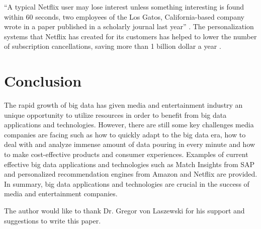 ``A typical Netflix user may lose interest unless something interesting is found within 60 seconds, two employees of the Los Gatos, California-based company wrote in a paper published in a scholarly journal last year''  \cite{Whitley2016data}. The personalization systems that Netflix has created for its customers has helped to lower the number of subscription cancellations, saving more than 1 billion dollar a year \cite{Whitley2016data}.

\section{Conclusion}

The rapid growth of big data has given media and entertainment industry an unique opportunity to utilize resources in order to benefit from big data applications and technologies. However, there are still some key challenges media companies are facing such as how to quickly adapt to the big data era, how to deal with and analyze immense amount of data pouring in every minute and how to make cost-effective products and consumer experiences. Examples of current effective big data applications and technologies such as Match Insights from SAP and personalized recommendation engines from Amazon and Netflix are provided. In summary, big data applications and technologies are crucial in the success of media and entertainment companies.

\begin{acks}

  The author would like to thank Dr. Gregor von Laszewski for his support and suggestions to write this paper.

\end{acks}


 
